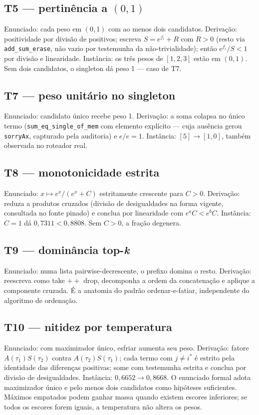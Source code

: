 \subsection{T5 --- pertinência a $(0,1)$}
Enunciado: cada peso em $(0,1)$ com ao menos dois candidatos. Derivação: positividade por divisão de positivos; escreva $S=e^{f_i}+R$ com $R>0$ (resto via \texttt{add\_sum\_erase}, não vazio por testemunha da não-trivialidade); então $e^{f_i}/S<1$ por divisão e linearidade. Instância: os três pesos de $[1,2,3]$ estão em $(0,1)$. Sem dois candidatos, o singleton dá peso 1 --- caso de T7.
\subsection{T7 --- peso unitário no singleton}
Enunciado: candidato único recebe peso 1. Derivação: a soma colapsa no único termo (\texttt{sum\_eq\_single\_of\_mem} com elemento explícito --- cuja ausência gerou \texttt{sorryAx}, capturado pela auditoria) e $e/e=1$. Instância: $[5]\to[1{,}0]$, também observada no roteador real.
\subsection{T8 --- monotonicidade estrita}
Enunciado: $x\mapsto e^x/(e^x+C)$ estritamente crescente para $C>0$. Derivação: reduza a produtos cruzados (divisão de desigualdades na forma vigente, consultada no fonte pinado) e conclua por linearidade com $e^aC<e^bC$. Instância: $C=1$ dá $0{,}7311<0{,}8808$. Sem $C>0$, a fração degenera.
\subsection{T9 --- dominância top-\textit{k}}
Enunciado: numa lista pairwise-decrescente, o prefixo domina o resto. Derivação: reescreva como take $++$ drop, decomponha a ordem da concatenação e aplique a componente cruzada. É a anatomia do padrão ordenar-e-fatiar, independente do algoritmo de ordenação.
\subsection{T10 --- nitidez por temperatura}
Enunciado: com maximizador único, esfriar aumenta seu peso. Derivação: fatore $A(\tau_1)S(\tau_2)$ contra $A(\tau_2)S(\tau_1)$; cada termo com $j\neq i^*$ é estrito pela identidade das diferenças positivas; some com testemunha estrita e conclua por divisão de desigualdades. Instância: $0{,}6652\to0{,}8668$. O enunciado formal adota maximizador único e pelo menos dois candidatos como hipóteses suficientes. Máximos empatados podem ganhar massa quando existem escores inferiores; se todos os escores forem iguais, a temperatura não altera os pesos.
